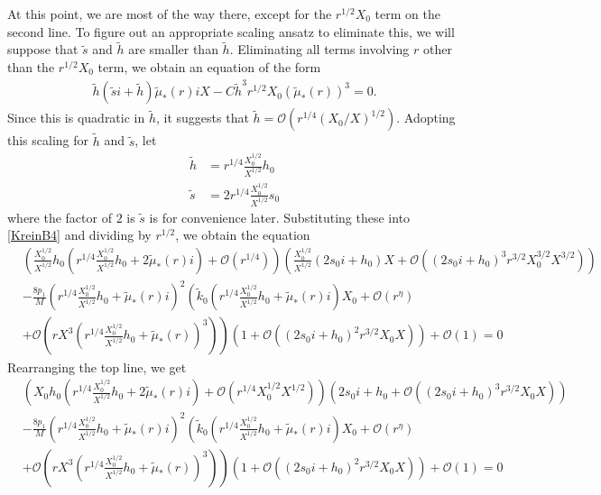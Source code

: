 \documentclass[thesis.tex]{subfiles}
\begin{document}
At this point, we are most of the way there, except for the $r^{1/2}X_0$ term on the second line. To figure out an appropriate scaling ansatz to eliminate this, we will suppose that $\tilde{s}$ and $\tilde{h}$ are smaller than $\tilde{h}$. Eliminating all terms involving $r$ other than the $r^{1/2}X_0$ term, we obtain an equation of the form
\begin{equation*}
\begin{aligned}
\tilde{h} (\tilde{s}i + \tilde{h}) \tilde{\mu}_*(r) i X
- C \tilde{h}^3 r^{1/2} X_0 (\tilde{\mu}_*(r))^3 = 0.
\end{aligned}
\end{equation*} 
Since this is quadratic in $\tilde{h}$, it suggests that $\tilde{h} = \mathcal{O}(r^{1/4}(X_0/X)^{1/2})$. Adopting this scaling for $\tilde{h}$ and $\tilde{s}$, let
\begin{align*}
\tilde{h} &= r^{1/4}\frac{X_0^{1/2}}{X^{1/2}} h_0 \\
\tilde{s} &= 2 r^{1/4}\frac{X_0^{1/2}}{X^{1/2}} s_0
\end{align*}
where the factor of $2$ is $\tilde{s}$ is for convenience later. Substituting these into \cref{KreinB4} and dividing by $r^{1/2}$, we obtain the equation
\begin{equation}\label{KreinB5}
\begin{aligned}
&\left( \frac{X_0^{1/2}}{X^{1/2}} h_0 \left( r^{1/4}\frac{X_0^{1/2}}{X^{1/2}} h_0 + 2 \tilde{\mu}_*(r) i\right) + \mathcal{O}( r^{1/4} ) \right) 
\left( \frac{X_0^{1/2}}{X^{1/2}}(2 s_0 i + h_0) X + \mathcal{O}\left( \left( 2 s_0 i + h_0 \right)^3 r^{3/2} X_0^{3/2} X^{3/2} \right) \right) \\
&-\frac{8 p_1}{M} \left( r^{1/4}\frac{X_0^{1/2}}{X^{1/2}} h_0 + \tilde{\mu}_*(r) i\right)^2 \left( \tilde{k}_0 \left(r^{1/4}\frac{X_0^{1/2}}{X^{1/2}} h_0 + \tilde{\mu}_*(r)i \right) X_0 + \mathcal{O}(r^{\eta}) \right.\\
&+ \left. \mathcal{O} \left (r X^3 \left(r^{1/4} \frac{X_0^{1/2}}{X^{1/2}} h_0 + \tilde{\mu}_*(r)\right)^3 \right) \right) \left( 1 + \mathcal{O}\left( \left(2 s_0 i + h_0\right)^2 r^{3/2} X_0 X \right) \right) + \mathcal{O}(1) = 0
\end{aligned}
\end{equation}
Rearranging the top line, we get
\begin{equation*}
\begin{aligned}
&\left( X_0 h_0 \left( r^{1/4}\frac{X_0^{1/2}}{X^{1/2}} h_0 + 2 \tilde{\mu}_*(r) i\right) + \mathcal{O}\left( r^{1/4} X_0^{1/2} X^{1/2} \right) \right) 
\left( 2 s_0 i + h_0 + \mathcal{O}\left( \left( 2 s_0 i + h_0 \right)^3 r^{3/2} X_0 X \right) \right) \\
&-\frac{8 p_1}{M} \left( r^{1/4}\frac{X_0^{1/2}}{X^{1/2}} h_0 + \tilde{\mu}_*(r) i\right)^2 \left( \tilde{k}_0 \left(r^{1/4}\frac{X_0^{1/2}}{X^{1/2}} h_0 + \tilde{\mu}_*(r)i \right) X_0 + \mathcal{O}(r^{\eta}) \right.\\
&+ \left. \mathcal{O} \left (r X^3 \left(r^{1/4} \frac{X_0^{1/2}}{X^{1/2}} h_0 + \tilde{\mu}_*(r)\right)^3 \right) \right) \left( 1 + \mathcal{O}\left( \left(2 s_0 i + h_0\right)^2 r^{3/2} X_0 X \right) \right) + \mathcal{O}(1) = 0
\end{aligned}
\end{equation*}
\end{document}
